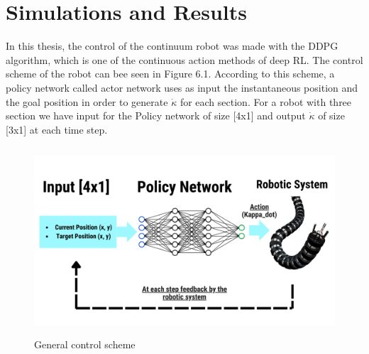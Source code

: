 \documentclass[12pt,twoside,a4]{mwbk}
\begin{document}
\chapter{Simulations and Results}
In this thesis, the control of the continuum robot was made with the DDPG algorithm, which is one of the continuous action methods of deep RL. The control scheme of the robot can bee seen in Figure 6.1. According to this scheme, a policy network called actor network uses as input the instantaneous position and the goal position in order to generate $\dot{\kappa}$ for each section. For a robot with three section we have input for the Policy network of size [4x1] and output $\dot{\kappa}$ of size [3x1] at each time step.
\begin{figure}[h]
    \centering
    \includegraphics[width=14.0cm, height=7.0cm]{control_scheme.png}
    \caption{General control scheme}
\end{figure}
\end{document}
